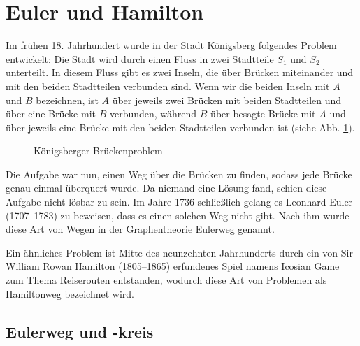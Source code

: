 \section{Euler und Hamilton}



Im frühen 18. Jahrhundert wurde in der Stadt Königsberg folgendes Problem entwickelt: Die Stadt wird durch einen Fluss in zwei Stadtteile $S_1$ und $S_2$  unterteilt. In diesem Fluss gibt es zwei Inseln, die über Brücken miteinander und mit den beiden Stadtteilen verbunden sind. Wenn wir die beiden Inseln mit $A$ und $B$ bezeichnen, ist $A$ über jeweils zwei Brücken mit beiden Stadtteilen und über eine Brücke mit $B$ verbunden, während $B$ über besagte Brücke mit $A$ und über jeweils eine Brücke mit den beiden Stadtteilen verbunden ist (siehe Abb. \ref{kb}).

\begin{figure}[ht]
\centering
{}
\caption{Königsberger Brückenproblem}
\label{kb}
\end{figure}

Die Aufgabe war nun, einen Weg über die Brücken zu finden, sodass jede Brücke genau einmal überquert wurde. Da niemand eine Lösung fand, schien diese Aufgabe nicht lösbar zu sein. Im Jahre 1736 schließlich gelang es Leonhard Euler (1707--1783) zu beweisen, dass es einen solchen Weg nicht gibt. Nach ihm wurde diese Art von Wegen in der Graphentheorie \glqq Eulerweg\grqq{}  genannt.

Ein ähnliches Problem ist Mitte des neunzehnten Jahrhunderts durch ein von Sir William Rowan Hamilton (1805--1865) erfundenes Spiel namens \glqq Icosian Game\grqq{} zum Thema Reiserouten entstanden, wodurch diese Art von Problemen als \glqq Hamiltonweg\grqq{} bezeichnet wird.

\subsection{Eulerweg und -kreis}
\label{sec.Euler}


